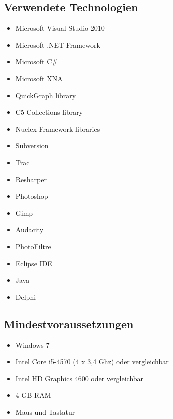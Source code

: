 \subsection{Verwendete Technologien}
\begin{itemize}
  \item Microsoft Visual Studio 2010
  \item Microsoft .NET Framework
  \item Microsoft C\#
  \item Microsoft XNA
  \item QuickGraph library
  \item C5 Collections library
  \item Nuclex Framework libraries
  \item Subversion
  \item Trac
  \item Resharper
  \item Photoshop
  \item Gimp
  \item Audacity
  \item PhotoFiltre
  \item Eclipse IDE
  \item Java
  \item Delphi
\end{itemize}

\subsection{Mindestvoraussetzungen}
\begin{itemize}
  \item Windows 7
  \item Intel Core i5-4570 (4 x 3,4 Ghz) oder vergleichbar
  \item Intel HD Graphics 4600 oder vergleichbar
  \item 4 GB RAM
  \item Maus und Tastatur
\end{itemize}
